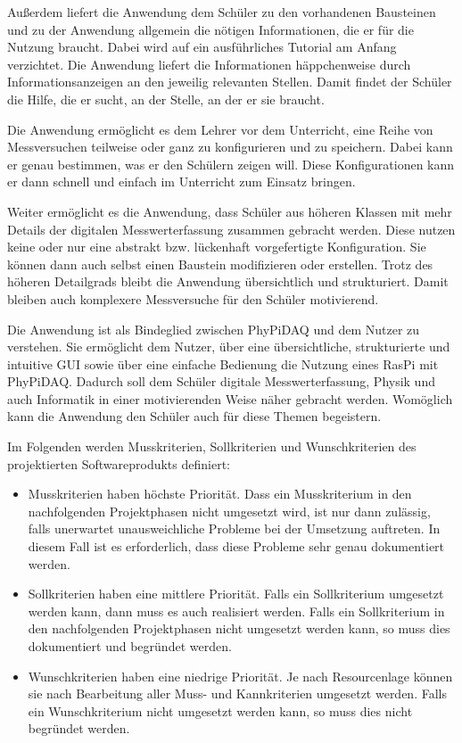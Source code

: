 \documentclass[parskip=full]{scrartcl}
\begin{document}
Außerdem liefert die Anwendung dem Schüler zu den vorhandenen Bausteinen und zu der Anwendung allgemein die nötigen Informationen, die er für die Nutzung braucht. Dabei wird auf ein ausführliches Tutorial am Anfang verzichtet. Die Anwendung liefert die Informationen häppchenweise durch Informationsanzeigen an den jeweilig relevanten Stellen. Damit findet der Schüler die Hilfe, die er sucht, an der Stelle, an der er sie braucht.

Die Anwendung ermöglicht es dem Lehrer vor dem Unterricht, eine Reihe von Messversuchen teilweise oder ganz zu konfigurieren und zu speichern. Dabei kann er genau bestimmen, was er den Schülern zeigen will. Diese Konfigurationen kann er dann schnell und einfach im Unterricht zum Einsatz bringen. 

Weiter ermöglicht es die Anwendung, dass Schüler aus höheren Klassen mit mehr Details der digitalen Messwerterfassung zusammen gebracht werden. Diese nutzen keine oder nur eine abstrakt bzw. lückenhaft vorgefertigte Konfiguration. Sie können dann auch selbst einen Baustein modifizieren oder erstellen. Trotz des höheren Detailgrads bleibt die Anwendung übersichtlich und strukturiert. Damit bleiben auch komplexere Messversuche für den Schüler motivierend. 

Die Anwendung ist als Bindeglied zwischen \gls{PhyPiDAQ} und dem Nutzer zu verstehen. Sie ermöglicht dem Nutzer, über eine übersichtliche, strukturierte und intuitive GUI sowie über eine einfache Bedienung die Nutzung eines \gls{RasPi} mit \gls{PhyPiDAQ}. Dadurch soll dem Schüler digitale Messwerterfassung, Physik und auch Informatik in einer motivierenden Weise näher gebracht werden. Womöglich kann die Anwendung den Schüler auch für diese Themen begeistern.  

Im Folgenden werden Musskriterien, Sollkriterien und Wunschkriterien des projektierten Softwareprodukts definiert:

\begin{itemize}
	\item Musskriterien haben höchste Priorität. 
	Dass ein Musskriterium in den nachfolgenden Projektphasen nicht umgesetzt wird, ist nur dann zulässig, falls unerwartet unausweichliche Probleme bei der Umsetzung auftreten. 
	In diesem Fall ist es erforderlich, dass diese Probleme sehr genau dokumentiert werden.
	
	\item Sollkriterien haben eine mittlere Priorität. 
	Falls ein Sollkriterium umgesetzt werden kann, dann muss es auch realisiert werden. 
	Falls ein Sollkriterium in den nachfolgenden Projektphasen nicht umgesetzt werden kann, so muss dies dokumentiert und begründet werden. 
	
	\item Wunschkriterien haben eine niedrige Priorität. 
	Je nach Resourcenlage können sie nach Bearbeitung aller Muss- und Kannkriterien umgesetzt werden. 
	Falls ein Wunschkriterium nicht umgesetzt werden kann, so muss dies nicht begründet werden. 
\end{itemize}
\end{document}
